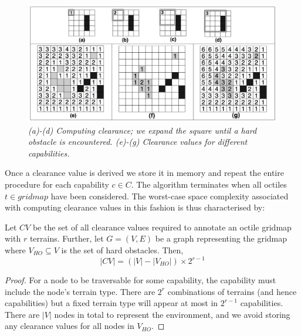 \begin{figure}[htbp]
	\vspace{-9pt}
       \caption{\emph{(a)-(d) Computing clearance; we expand the square until a hard obstacle is encountered. (e)-(g) Clearance values for different capabilities.} \vspace{0.5em}}
       \begin{center}
                       \includegraphics[scale=0.20, trim = 20mm 9mm 20mm 0mm]{diagrams/annotations.png}
       \end{center}
       \label{aha-fig:annotations}
	\vspace{-6pt}
\end{figure}

Once a clearance value is derived we store it in memory and repeat the entire procedure for each capability $c \in C$.  
The algorithm terminates when all octiles $t \in gridmap$ have been considered. 
The worst-case space complexity associated with computing clearance values in this fashion is thus characterised by: 
\begin{lemma}
\label{aha-lemma:numannotations}
Let $CV$ be the set of all clearance values required to annotate an octile gridmap with $r$ terrains. Further, let $G = (V, E)$ be a graph representing the gridmap where $V_{HO} \subseteq V$ is the set of hard obstacles. Then, 
$$|CV| = (|V| - |V_{HO}|)\times 2^{r-1}$$
\end{lemma}

\begin{proof}
For a node to be traversable for some capability, the capability must include the node's terrain type. 
There are $2^{r}$ combinations of terrains (and hence capabilities) but a fixed terrain type will appear at most in $2^{r-1}$ capabilities. 
There are $|V|$ nodes in total to represent the environment, and we avoid storing any clearance values for all nodes in $V_{HO}$. 
\end{proof}

